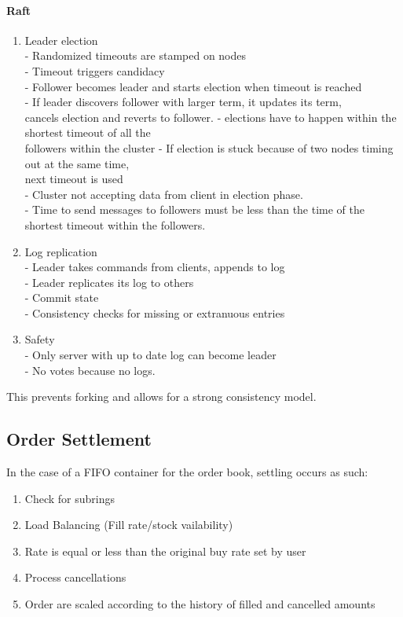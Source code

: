 \documentclass[]{article}
\begin{document}
\paragraph{Raft}

\begin{enumerate}
	\item Leader election\\
	- Randomized timeouts are stamped on nodes\\
	- Timeout triggers candidacy\\
	- Follower becomes leader and starts election when timeout is reached\\
	- If leader discovers follower with larger term, it updates its term,\\  cancels election and reverts to follower.
	- elections have to happen within the shortest timeout of all the\\ followers within the cluster
	- If election is stuck because of two nodes timing out at the same time,\\ 
	next timeout is used\\
	- Cluster not accepting data from client in election phase.\\
	- Time to send messages to followers must be less than the time
	of the shortest timeout within the followers. 
	\item Log replication\\
		- Leader takes commands from clients, appends to log\\
		- Leader replicates its log to others\\
		- Commit state\\
		- Consistency checks for missing or extranuous entries\\
	\item Safety\\
	- Only server with up to date log can become leader\\
	- No votes because no logs.\\
\end{enumerate}
This prevents forking and allows for a strong consistency model.
\paragraph{}

\subsection{Order Settlement}
In the case of a FIFO container for the order book,
settling occurs as such:
\begin{enumerate}
	\item Check for subrings
	\item Load Balancing (Fill rate/stock vailability)
	\item Rate is equal or less than the original buy rate set by user
	\item Process cancellations
	\item Order are scaled according to the history of filled and cancelled amounts 
\end{enumerate}	
	
\end{document}
